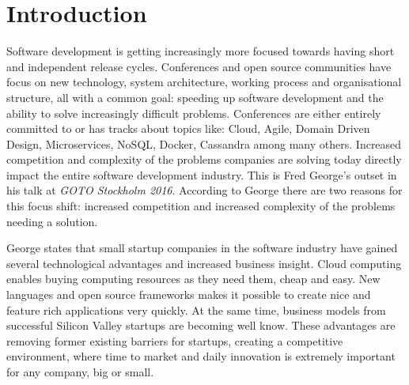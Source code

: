 \chapter{Introduction}
\label{ch:introduction}


Software development is getting increasingly more focused towards having short and independent release cycles. Conferences and open source communities have focus on new technology, system architecture, working process and organisational structure, all with a common goal: speeding up software development and the ability to solve increasingly difficult problems. Conferences are either entirely committed to or has tracks about topics like: Cloud, Agile, Domain Driven Design, Microservices, NoSQL, Docker, Cassandra among many others. Increased competition and complexity of the problems companies are solving today directly impact the entire software development industry. This is Fred George's outset in his talk at \textit{GOTO Stockholm 2016}\cite{george2016it}. According to George there are two reasons for this focus shift: increased competition and increased complexity of the problems needing a solution.

George states that small startup companies in the software industry have gained several technological advantages and increased business insight. Cloud computing enables buying computing resources as they need them, cheap and easy. New languages and open source frameworks makes it possible to create nice and feature rich applications very quickly. At the same time, business models from successful Silicon Valley startups are becoming well know. These advantages are removing former existing barriers for startups, creating a competitive environment, where time to market and daily innovation is extremely important for any company, big or small.

